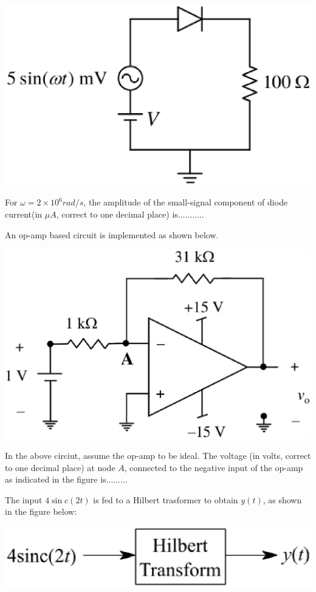 \includegraphics[scale=0.35]{47}

For $\omega = 2 \times 10^{6}rad/s$, the amplitude of the small-signal component of diode current(in $\mu A$, correct to one decimal place) is...........

\item An op-amp based circuit is implemented as shown below.

\includegraphics[scale=0.3]{48}

In the above circiut, assume the op-amp to be ideal. The voltage (in volts, correct to one decimal place) at node $A$, connected to the negative input of the op-amp as indicated in the figure is.........

\item The input $4\sin c(2t)$ is fed to a Hilbert trasformer to obtain $y(t)$, as shown in the figure below:

\includegraphics[scale=0.4]{49}


